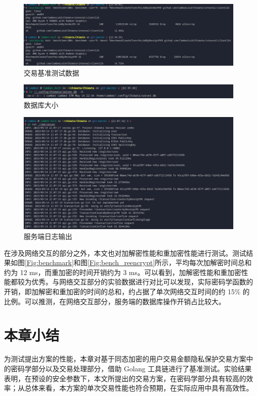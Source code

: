 \begin{figure}[ht]
    \centering
    \includegraphics[width=0.9\linewidth]{./Figures/Bench_Transaction_all.png}
    \caption{交易基准测试数据}\label{Fig:bench_transaction}
\end{figure}

\begin{figure}[ht]
    \centering
    \includegraphics[width=0.9\linewidth]{./Figures/Test_Database_Size.png}
    \caption{数据库大小}\label{Fig:database_size}
\end{figure}

\begin{figure}[ht]
    \centering
    \includegraphics[width=0.9\linewidth]{./Figures/Server_ReceiptPK.png}
    \caption{服务端日志输出}\label{Fig:server}
\end{figure}

在涉及网络交互的部分之外，本文也对加解密性能和重加密性能进行测试。测试结果如图\ref{Fig:benchmark}和图\ref{Fig:bench_reencrypt}所示，平均每次加解密时间总和约为 12 ms，而重加密的时间开销约为 3 ms。可以看到，加解密性能和重加密性能都较为优秀。与网络交互部分的实验数据进行对比可以发现，实际密码学函数的开销，即加解密和重加密的时间的总和，约占据了单次网络交互时间的约 15\% 的比例。可以推测，在网络交互部分，服务端的数据库操作开销占比较大。

\section{本章小结}

为测试提出方案的性能，本章对基于同态加密的用户交易金额隐私保护交易方案中的密码学部分以及交易处理部分，借助 Golang 工具链进行了基准测试。实验结果表明，在预设的安全参数下，本文所提出的交易方案，在密码学部分具有较高的效率；从总体来看，本方案的单次交易性能也符合预期，在实际应用中具有高效性。
